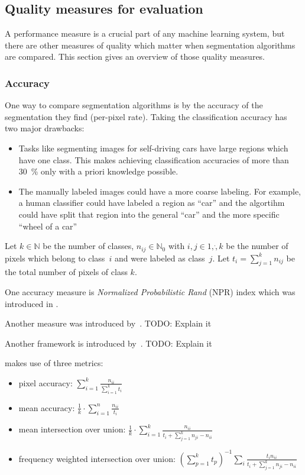 \subsection{Quality measures for evaluation}\label{subsec:quality-measures}

A performance measure is a crucial part of any machine learning system, but
there are other measures of quality which matter when segmentation algorithms
are compared. This section gives an overview of those quality measures.


\subsubsection{Accuracy}
One way to compare segmentation algorithms is by the accuracy of the
segmentation they find (per-pixel rate). Taking the classification accuracy has
two major drawbacks:

\begin{itemize}
    \item Tasks like segmenting images for self-driving cars have large regions
          which have one class. This makes achieving classification accuracies
          of more than \SI{30}{\percent} only with a priori knowledge possible.
    \item The manually labeled images could have a more coarse labeling. For
          example, a human classifier could have labeled a region as
          \enquote{car} and the algortihm could have split that region into
          the general \enquote{car} and the more specific \enquote{wheel of a
          car}
\end{itemize}

Let $k \in \mathbb{N}$ be the number of classes, $n_{ij} \in \mathbb{N}_0$ with
$i,j \in 1, \dot, k$ be the number of pixels which belong to class~$i$ and were
labeled as class~$j$. Let $t_i = \sum_{j=1}^k n_{ij}$ be the total number of
pixels of class $k$.

One accuracy measure is \textit{Normalized Probabilistic Rand} (NPR) index
which was introduced in \cite{unnikrishnan2005measure}.

Another measure was introduced by~\cite{celebi2009improved}. TODO: Explain it

Another framework is introduced by~\cite{jaber2010probabilistic}. TODO: Explain
it

\cite{long2014fully} makes use of three metrics:

\begin{itemize}
    \item pixel accuracy: $\sum_{i=1}^k \frac{n_{ii}}{\sum_{i=1}^k t_i}$
    \item mean accuracy: $\frac{1}{k} \cdot \sum_{i=1}^n \frac{n_{ii}}{t_i}$
    \item mean intersection over union: $\frac{1}{k} \cdot \sum_{i=1}^k \frac{n_{ii}}{t_i + \sum_{j=1}^k n_{ji}-n_{ii}}$
    \item frequency weighted intersection over union:
          ${({\sum_{p=1}^k t_p})}^{-1} \sum_i \frac{t_i n_{ii}}{t_i + \sum_{j=1}^k n_{ji} - n_{ii}}$
\end{itemize}

